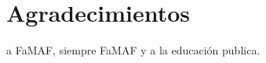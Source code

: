 \documentclass[aps,prl,twocolumn,groupedaddress]{revtex4-2}
\begin{document}

\section{Agradecimientos}

\begin{acknowledgments}
a FaMAF, siempre FaMAF y a la educación publica.
\end{acknowledgments}



\onecolumngrid

\appendix
\end{document}
